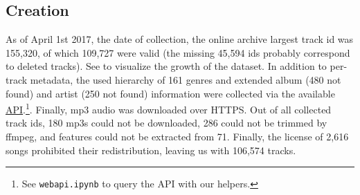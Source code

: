 \documentclass{article}
\newcommand{\ntracks}{106,574 }
\begin{document}
\subsection{Creation} %

As of April 1st 2017, the date of collection, the online archive largest track id was 155,320, of which 109,727 were valid (the missing 45,594 ids probably correspond to deleted tracks). See  to visualize the growth of the dataset. In addition to per-track metadata, the used hierarchy of 161 genres and extended album (480 not found) and artist (250 not found) information were collected via the available \href{https://freemusicarchive.org/api}{API}.\footnote{See \texttt{webapi.ipynb} to query the API with our helpers.}. Finally, mp3 audio was downloaded over HTTPS.
Out of all collected track ids, 180 mp3s could not be downloaded, 286 could not be trimmed by ffmpeg, and features could not be extracted from 71. Finally, the license of 2,616 songs prohibited their redistribution, leaving us with \ntracks tracks.


\end{document}
